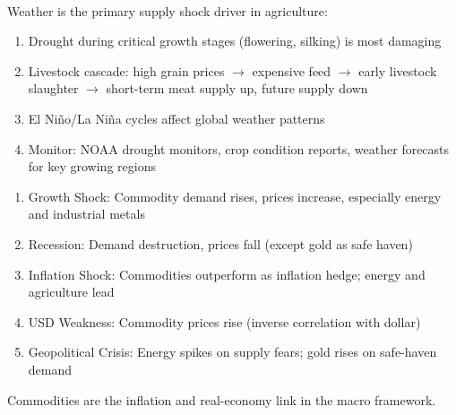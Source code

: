 \documentclass[a4paper,oneside,openany]{book}
\begin{document}
\begin{remark} \\
Weather is the primary supply shock driver in agriculture:
\begin{enumerate}[label=\roman*.]
\setlength{\itemsep}{0pt}
\item Drought during critical growth stages (flowering, silking) is most damaging
\item Livestock cascade: high grain prices $\to$ expensive feed $\to$ early livestock slaughter $\to$ short-term meat supply up, future supply down
\item El Ni\~{n}o/La Ni\~{n}a cycles affect global weather patterns
\item Monitor: NOAA drought monitors, crop condition reports, weather forecasts for key growing regions
\end{enumerate}
\end{remark}

\begin{remark} 
\begin{enumerate}[label=\roman*.]
\setlength{\itemsep}{0pt}
\item Growth Shock: Commodity demand rises, prices increase, especially energy and industrial metals
\item Recession: Demand destruction, prices fall (except gold as safe haven)
\item Inflation Shock: Commodities outperform as inflation hedge; energy and agriculture lead
\item USD Weakness: Commodity prices rise (inverse correlation with dollar)
\item Geopolitical Crisis: Energy spikes on supply fears; gold rises on safe-haven demand
\end{enumerate}
Commodities are the inflation and real-economy link in the macro framework.
\end{remark}
\end{document}
